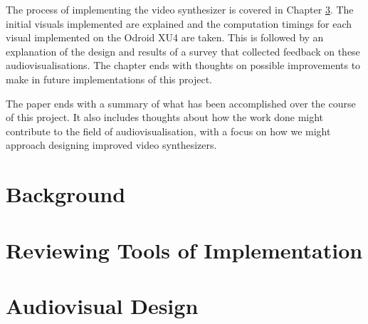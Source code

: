 \documentclass{report}
\begin{document}
The process of implementing the video synthesizer is covered in Chapter \ref{chap:avdesign}. The initial visuals implemented are explained and the computation timings for each visual implemented on the Odroid XU4 are taken. This is followed by an explanation of the design and results of a survey that collected feedback on these audiovisualisations. The chapter ends with thoughts on possible improvements to make in future implementations of this project. \par

The paper ends with a summary of what has been accomplished over the course of this project. It also includes thoughts about how the work done might contribute to the field of audiovisualisation, with a focus on how we might approach designing improved video synthesizers.


\chapter{Background}\label{chap:background}




\chapter{Reviewing Tools of Implementation}\label{chap:toolreview}



\chapter{Audiovisual Design}\label{chap:avdesign}





\end{document}
